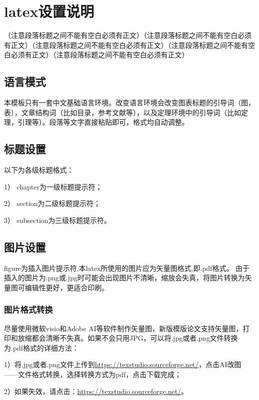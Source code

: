 \documentclass{standalone}
\begin{document}
\chapter{latex设置说明}

（注意段落标题之间不能有空白必须有正文）（注意段落标题之间不能有空白必须有正文）（注意段落标题之间不能有空白必须有正文）（注意段落标题之间不能有空白必须有正文）（注意段落标题之间不能有空白必须有正文）

\label{chap2}

\section{语言模式}

本模板只有一套中文基础语言环境。改变语言环境会改变图表标题的引导词（图，表），文章结构词（比如目录，参考文献等），以及定理环境中的引导词（比如定理，引理等）。段落等文字直接粘贴即可，格式均自动调整。

\section{标题设置}
以下为各级标题格式：

1） {chapter}为一级标题提示符；

2）  {section}为二级标题提示符；

3）  {subsection}为三级标题提示符。

\section{图片设置}
{figure}为插入图片提示符,本latex所使用的图片应为矢量图格式,即.pdf格式。
由于插入的图片为.png或.jpg时可能会出现图片不清晰，缩放会失真，将图片转换为矢量图可编辑性更好，更适合印刷。

\subsection{图片格式转换}

尽量使用微软visio和Adobe AI等软件制作矢量图，新版模版论文支持矢量图，打印和放缩都会清晰不失真。如果不会只用JPG，可以将.jpg或者.png文件转换为.pdf格式的详细方法：

1）将.jpg或者.png文件上传到\href{https://img.logosc.cn/?utm_source=zhihutg05.com/}{https://texstudio.sourceforge.net/}，点击AI改图——文件格式转换，选择转换方式为pdf，点击下载完成；

2）如果失效，请点击：\href{https://www.zhihu.com/question/292896684}{https://texstudio.sourceforge.net/}。
\end{document}
